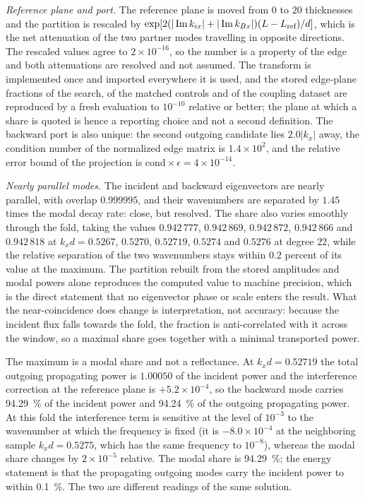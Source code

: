 \emph{Reference plane and port.}  The reference plane is moved from $0$ to $20$
thicknesses and the partition is rescaled by
$\exp[2(|\operatorname{Im} k_{ix}|+|\operatorname{Im} k_{Bx}|)(L-L_{\text{ref}})/d]$, which is the net
attenuation of the two partner modes travelling in opposite directions.  The
rescaled values agree to $2\times10^{-16}$, so the number is a property of the
edge and both attenuations are resolved and not assumed.  The transform is
implemented once and imported everywhere it is used, and the stored edge-plane
fractions of the search, of the matched controls and of the coupling dataset
are reproduced by a fresh evaluation to $10^{-10}$ relative or better; the plane at
which a share is quoted is hence a reporting choice and not a second
definition.  The backward port
is also unique: the second outgoing candidate lies $2.0|k_x|$ away, the
condition number of the normalized edge matrix is $1.4\times10^{2}$, and the
relative error bound of the projection is $\text{cond}\times\epsilon=4\times10^{-14}$.

\emph{Nearly parallel modes.}  The incident and backward eigenvectors
are nearly parallel, with overlap $0.999995$, and their wavenumbers are
separated by $1.45$ times the modal decay rate: close, but resolved.  The share also varies smoothly through the fold, taking the values $0.942\,777$, $0.942\,869$, $0.942\,872$, $0.942\,866$ and $0.942\,818$ at $k_xd=0.5267$, $0.5270$, $0.52719$, $0.5274$ and $0.5276$ at degree $22$, while the relative separation of the two wavenumbers stays within $0.2$ percent of its value at the maximum.  The
partition rebuilt from the stored amplitudes and modal powers alone reproduces the computed value to machine precision, which is the direct statement that no
eigenvector phase or scale enters the result.  What the near-coincidence does
change is interpretation, not accuracy: because the incident flux falls towards
the fold, the fraction is anti-correlated with it across the window, so a maximal share goes together with a minimal transported power.

The maximum is a modal share and not a reflectance.  At $k_xd=0.52719$ the
total outgoing propagating power is $1.00050$ of the incident power and the
interference correction at the reference plane is $+5.2\times10^{-4}$, so the
backward mode carries \SI{94.29}{\percent} of the incident power and
\SI{94.24}{\percent} of the outgoing propagating power.  At this fold the
interference term is sensitive at the level of $10^{-3}$ to the wavenumber at which the
frequency is fixed (it is $-8.0\times10^{-4}$ at the neighboring sample $k_xd=0.5275$, which has the same frequency to $10^{-8}$), whereas the modal share changes by $2\times10^{-5}$ relative.  The modal share is
\SI{94.29}{\percent}; the energy statement is that the propagating outgoing
modes carry the incident power to within \SI{0.1}{\percent}.  The two are different readings of the same
solution.

